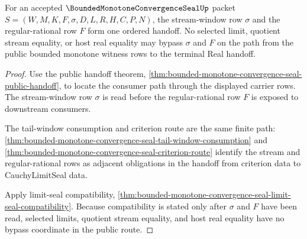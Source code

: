\begin{theorem}
\label{thm:bounded-monotone-convergence-seal-stream-window-regular-handoff-lock}
For an accepted $\BoundedMonotoneConvergenceSealUp$ packet $S=(W,M,K,F,\sigma,D,L,R,H,C,P,N)$, the stream-window row $\sigma$ and the regular-rational row $F$ form one ordered handoff. No selected limit, quotient stream equality, or host real equality may bypass $\sigma$ and $F$ on the path from the public bounded monotone witness rows to the terminal Real handoff.
\end{theorem}
\begin{proof}
Use the public handoff theorem, \autoref{thm:bounded-monotone-convergence-seal-public-handoff}, to locate the consumer path through the displayed carrier rows. The stream-window row $\sigma$ is read before the regular-rational row $F$ is exposed to downstream consumers.

The tail-window consumption and criterion route are the same finite path: \autoref{thm:bounded-monotone-convergence-seal-tail-window-consumption} and \autoref{thm:bounded-monotone-convergence-seal-criterion-route} identify the stream and regular-rational rows as adjacent obligations in the handoff from criterion data to CauchyLimitSeal data.

Apply limit-seal compatibility, \autoref{thm:bounded-monotone-convergence-seal-limit-seal-compatibility}. Because compatibility is stated only after $\sigma$ and $F$ have been read, selected limits, quotient stream equality, and host real equality have no bypass coordinate in the public route.
\end{proof}

